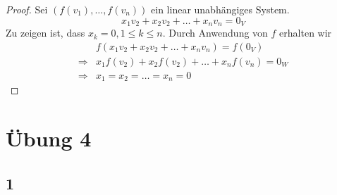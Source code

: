\documentclass[a4paper,10pt]{article}
\begin{document}
\begin{proof}
 Sei $(f(v_1), \dots, f(v_n))$ ein linear unabhängiges System.
 \begin{equation}
  x_1v_2 + x_2v_2 + \dots + x_nv_n = 0_V
 \end{equation}
 Zu zeigen ist, dass $x_k = 0, 1 \le k \le n$.
 Durch Anwendung von $f$ erhalten wir
 \begin{align*}
  & f(x_1v_2 + x_2v_2 + \dots + x_nv_n) = f(0_V)\\
  \Rightarrow & x_1f(v_2) + x_2f(v_2) + \dots + x_nf(v_n) = 0_W\\
  \Rightarrow & x_1 = x_2 = \dots = x_n = 0
 \end{align*}
\end{proof}

\section*{Übung 4}

\subsection*{1}
\end{document}
